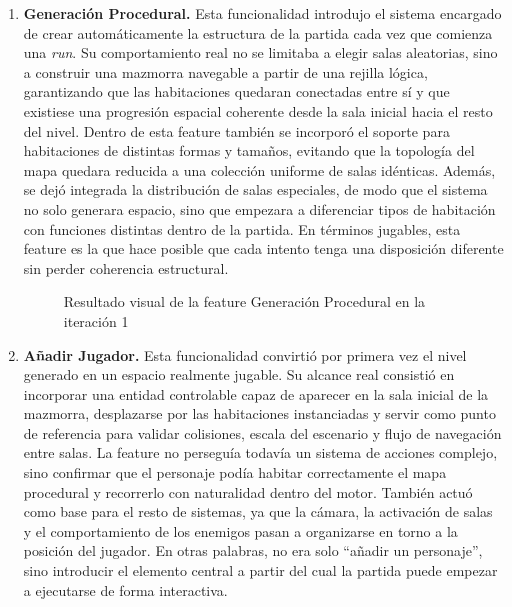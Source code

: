 \begin{enumerate}
\item \textbf{Generación Procedural.} Esta funcionalidad introdujo el sistema encargado de
crear automáticamente la estructura de la partida cada vez que comienza una \textit{run}.
Su comportamiento real no se limitaba a elegir salas aleatorias, sino a construir una
mazmorra navegable a partir de una rejilla lógica, garantizando que las habitaciones
quedaran conectadas entre sí y que existiese una progresión espacial coherente desde la
sala inicial hacia el resto del nivel. Dentro de esta feature también se incorporó el
soporte para habitaciones de distintas formas y tamaños, evitando que la topología del mapa
quedara reducida a una colección uniforme de salas idénticas. Además, se dejó integrada la
distribución de salas especiales, de modo que el sistema no solo generara espacio, sino que
empezara a diferenciar tipos de habitación con funciones distintas dentro de la partida.
En términos jugables, esta feature es la que hace posible que cada intento tenga una
disposición diferente sin perder coherencia estructural.

\begin{figure}[H]
\begin{center}
\caption{Resultado visual de la feature Generación Procedural en la iteración 1}
\label{fig:iteracion1-feature-generacion}
\end{center}
\end{figure}

\item \textbf{Añadir Jugador.} Esta funcionalidad convirtió por primera vez el nivel
generado en un espacio realmente jugable. Su alcance real consistió en incorporar una
entidad controlable capaz de aparecer en la sala inicial de la mazmorra, desplazarse por
las habitaciones instanciadas y servir como punto de referencia para validar colisiones,
escala del escenario y flujo de navegación entre salas. La feature no perseguía todavía un
sistema de acciones complejo, sino confirmar que el personaje podía habitar correctamente
el mapa procedural y recorrerlo con naturalidad dentro del motor. También actuó como base
para el resto de sistemas, ya que la cámara, la activación de salas y el comportamiento de
los enemigos pasan a organizarse en torno a la posición del jugador. En otras palabras, no
era solo ``añadir un personaje'', sino introducir el elemento central a partir del cual la
partida puede empezar a ejecutarse de forma interactiva.


\end{enumerate}
